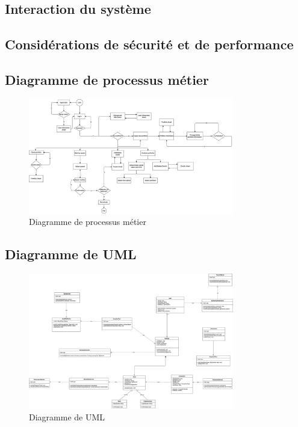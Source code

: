 \documentclass{article}
\begin{document}
\subsection{Interaction du système}



\subsection{Considérations de sécurité et de performance}



\subsection{Diagramme de processus métier}
\begin{figure}[h]
    \centering
    \includegraphics[width=0.8\textwidth]{../analysises/bussness process/V1.0/analysisV1.0.png}
    \caption{Diagramme de processus métier}
    \label{fig:processusMetier}
\end{figure}
\newpage
\subsection{Diagramme de UML}
\begin{figure}[h]
    \centering
    \includegraphics[width=0.8\textwidth]{../analysises/UML/V1.0/UMLV1.0.png}
    \caption{Diagramme de UML}
    \label{fig:UML}
\end{figure}
\end{document}

